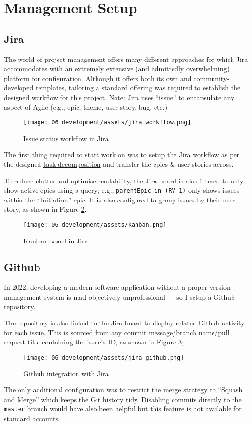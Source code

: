 \section{Management Setup}

\subsection{Jira}
The world of project management offers many different
approaches for which Jira accommodates with an extremely
extensive (and admittedly overwhelming) platform for
configuration.
Although it offers both its own and community-developed
templates, tailoring a standard offering was required to
establish the designed workflow for this project.
Note: Jira uses \enquote{issue} to encapsulate any aspect
of Agile (e.g., epic, theme, user story, bug, etc.)

\begin{figure}[h]
  \centering
  \texttt{[image: 06
    development/assets/jira workflow.png]}
  \caption{Issue status workflow in Jira}
  \label{fig:workflow}
\end{figure}

The first thing required to start work on \projectname{}
was to setup the Jira workflow as per the designed
\hyperref[p:decomp]{task decomposition} and transfer the
epics \& user stories across.

To reduce clutter and optimise readability, the Jira board
is also filtered to only show active epics using a query;
e.g., \lstinline{parentEpic in (RV-1)} only shows issues
within the \enquote{Initiation} epic.
It is also configured to group issues by their user story,
as shown in Figure \ref{fig:kanban}.

\begin{figure}[h]
  \centering
  \texttt{[image: 06
    development/assets/kanban.png]}
  \caption{Kanban board in Jira}
  \label{fig:kanban}
\end{figure}

\subsection{Github}
In 2022, developing a modern software application without a
proper version management system is
\sout{mad} objectively unprofessional --- so I setup a
Github repository. 

The repository is also linked to the Jira board to display
related Github activity for each issue. This is sourced from 
any commit message/branch name/pull request title
containing the issue's ID, as shown in Figure
\ref{fig:jiraGithub};

\begin{figure}[h]
  \centering
  \texttt{[image: 06
    development/assets/jira github.png]}
  \caption{Github integration with Jira}
  \label{fig:jiraGithub}
\end{figure}

The only additional configuration was to restrict the merge
strategy to \enquote{Squash and Merge} which keeps the Git
history tidy. Disabling commits directly to the
\lstinline{master} branch would have also been helpful but
this feature is not available for standard accounts.